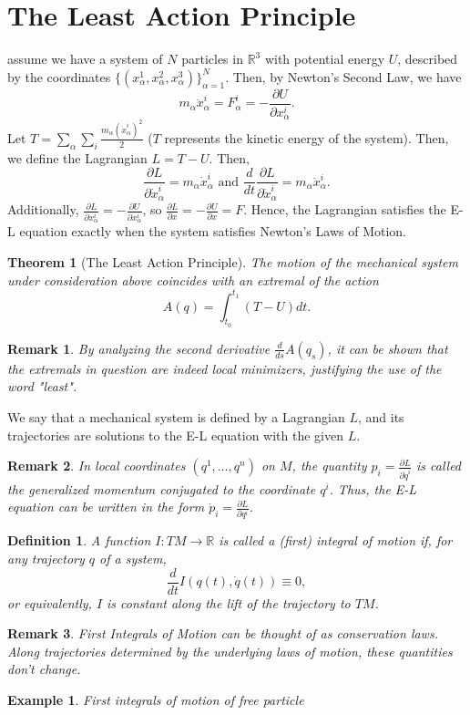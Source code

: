 \documentclass{article}
\newcommand{\R}{\mathbb R}
\newcommand{\al}{\alpha}
\newcommand{\pdof}[2]{\frac{\partial #1}{\partial #2}}
\newtheorem{thm}{Theorem}
\newtheorem{ex}{Example}
\newtheorem{defn}{Definition}
\newtheorem{rmk}{Remark}
\begin{document}
\section{The Least Action Principle}
assume we have a system of $N$ particles in $\R^3$ with potential energy $U$, described by the coordinates $\{(x_\al^1,x_\al^2,x_\al^3)\}_{\al=1}^N$. Then, by Newton's Second Law, we have
\[m_\al \ddot x_\al^i = F_\al^i = -\pdof{U}{x_\al^i}.\]
Let $T = \sum_\al\sum_i \frac{m_\al (\dot x^i_\al)^2}{2}$ ($T$ represents the kinetic energy of the system). Then, we define the Lagrangian $L = T-U$. Then,
\[\pdof{L}{\dot x_\al^i} = m_\al\dot x_\al^i\text{ and }\frac{d}{dt}\pdof{L}{\dot x_{\al}^i} = m_\al \ddot x_{\al}^i.\]
Additionally, $\pdof{L}{x_\al^i} = -\pdof{U}{x_\al^i}$, so $\pdof{L}{x} = -\pdof{U}{x} = F$. Hence, the Lagrangian satisfies the E-L equation exactly when the system satisfies Newton's Laws of Motion.
\begin{thm}[The Least Action Principle]
    The motion of the mechanical system under consideration above coincides with an extremal of the action
    \[A(q) = \int_{t_0}^{t_1}(T-U)dt.\]
\end{thm}
\begin{rmk}
    By analyzing the second derivative $\frac{d}{ds}A(q_s)$, it can be shown that the extremals in question are indeed local minimizers, justifying the use of the word "least".
\end{rmk}
We say that a mechanical system is defined by a Lagrangian $L$, and its trajectories are solutions to the E-L equation with the given $L$.
\begin{rmk}
    In local coordinates $(q^1,\dots,q^n)$ on $M$, the quantity $p_i = \pdof{L}{\dot q^i}$ is called the generalized momentum conjugated to the coordinate $q^i$. Thus, the E-L equation can be written in the form $\dot p_i = \pdof{L}{q^i}$.
\end{rmk}
\begin{defn}
    A function $I:TM\to \R$ is called a (first) integral of motion if, for any trajectory $q$ of a system, 
    \[\frac{d}{dt}I(q(t),\dot q(t))\equiv 0,\]
    or equivalently, $I$ is constant along the lift of the trajectory to $TM$.
\end{defn}
\begin{rmk}
    First Integrals of Motion can be thought of as conservation laws. Along trajectories determined by the underlying laws of motion, these quantities don't change.
\end{rmk}
\begin{ex}
    First integrals of motion of free particle
\end{ex}
\end{document}

